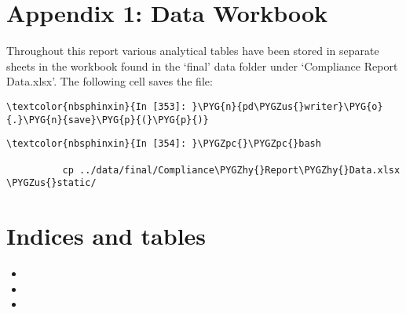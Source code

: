 \documentclass[letterpaper,10pt,english]{sphinxmanual}
\begin{document}
\chapter{Appendix 1: Data Workbook}
\label{\detokenize{Global Affairs Canada - Compliance Report:Appendix-1:-Data-Workbook}}
Throughout this report various analytical tables have been stored in
separate sheets in the workbook found in the `final' data folder under
`Compliance Report Data.xlsx'. The following cell saves the file:

\begin{Verbatim}[commandchars=\\\{\}]
\textcolor{nbsphinxin}{In [353]: }\PYG{n}{pd\PYGZus{}writer}\PYG{o}{.}\PYG{n}{save}\PYG{p}{(}\PYG{p}{)}
\end{Verbatim}

\begin{Verbatim}[commandchars=\\\{\}]
\textcolor{nbsphinxin}{In [354]: }\PYGZpc{}\PYGZpc{}bash
          
          cp ../data/final/Compliance\PYGZhy{}Report\PYGZhy{}Data.xlsx \PYGZus{}static/
\end{Verbatim}



\chapter{Indices and tables}
\label{\detokenize{index:indices-and-tables}}\begin{itemize}
\item {} 

\item {} 

\item {} 

\end{itemize}



\renewcommand{\indexname}{Index}
\printindex
\end{document}
